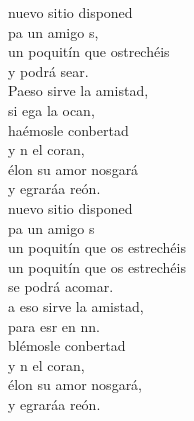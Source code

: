 \documentclass[12pt]{article}
\begin{document}
\begin{multicols*}{2}
\begin{cancion}%
	nuevo sitio disponed\\
	pa un amigo s,\\
	un poquitín que ostrechéis\\
	y podrá sear.\\
	Paeso sirve la amistad,\\
	si ega la ocan, \\
	haémosle conbertad\\
	y n el coran,\\
	élon su amor nosgará\\
	y egraráa reón.\\
\jump
	nuevo sitio disponed\\
	pa un amigo s\\
un poquitín que os estrechéis\\
un poquitín que os estrechéis\\
	se podrá acomar.\\
	a eso sirve la amistad,\\
	para esr en nn.\\
	blémosle conbertad\\
	y n el coran,\\
	élon su amor nosgará,\\
	y egraráa reón.\\
\end{cancion}%


\end{multicols*}
\end{document}
